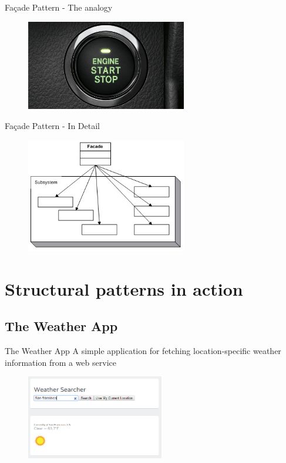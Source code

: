 \documentclass{beamer}
\begin{document}
\begin{frame}{Fa\c{c}ade Pattern - The analogy}
    \begin{figure}[htp]
    \centering
    \includegraphics[width=7cm]{pics/facade2}
    \label{fig:facade}
    \end{figure}
\end{frame}


\begin{frame}{Fa\c{c}ade Pattern - In Detail}
    \begin{figure}[htp]
    \centering
    \includegraphics[width=7cm]{pics/facade}
    \label{fig:facade2}
    \end{figure}
\end{frame}

\section{Structural patterns in action}
\subsection{The Weather App}

 \begin{frame}{The Weather App\footnotemark}
A simple application for fetching location-specific weather information from a web service
    \begin{figure}[htp]
    \centering
    \includegraphics[width=6cm]{pics/weathersearcher2}
    \label{fig:weather1}
    \end{figure}
    

\end{frame}
\end{document}
